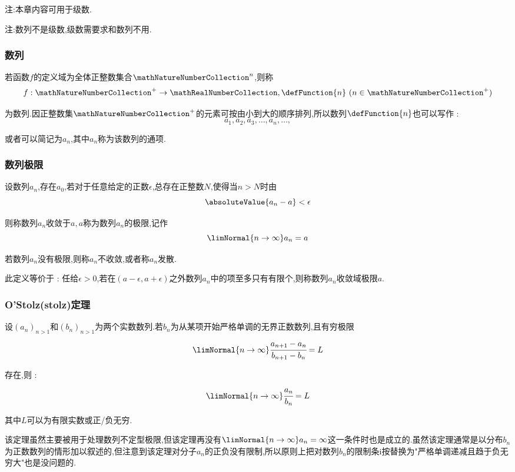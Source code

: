 {{{    注:本章内容可用于级数.

    注:数列不是级数,级数需要求和数列不用.

    \subsubsection{数列}{
      若函数$f$的定义域为全体正整数集合$\mathNatureNumberCollection^n$,则称
      $$
        f : \mathNatureNumberCollection^+ \to \mathRealNumberCollection,\defFunction{n} \ (n \in \mathNatureNumberCollection^+)
      $$

      为数列.因正整数集$\mathNatureNumberCollection^+$的元素可按由小到大的顺序排列,所以数列$\defFunction{n}$也可以写作 :
      $$
        a_1,a_2,a_3,\dots,a_n,\dots,
      $$

      或者可以简记为${a_n}$,其中$a_n$称为该数列的通项.
    }%

    \subsubsection{数列极限}{
      设数列${a_n}$,存在$a_0$,若对于任意给定的正数$\epsilon$,总存在正整数$N$,使得当$n > N$时由
      $$
        \absoluteValue{a_n - a} < \epsilon
      $$

      则称数列${a_n}$收敛于$a,a$称为数列$a_n$的极限,记作
      $$
        \limNormal{n \to \infty}a_n = a
      $$

      若数列${a_n}$没有极限,则称${a_n}$不收敛,或者称${a_n}$发散.

      此定义等价于 : 任给$\epsilon > 0$,若在$(a - \epsilon,a + \epsilon)$之外数列${a_n}$中的项至多只有有限个,则称数列${a_n}$收敛域极限$a$.
    }%

    \subsubsection{O'Stolz(stolz)定理}{
      设$(a_n)_{n > 1}$和$(b_n)_{n > 1}$为两个实数数列.若$b_n$为从某项开始严格单调的无界正数数列,且有穷极限
      $$
        \limNormal{n \to \infty}\cfrac{a_{n + 1} - a_n}{b_{n + 1} - b_n} = L
      $$

      存在,则 :
      $$
        \limNormal{n \to \infty}\cfrac{a_n}{b_n} = L
      $$

      其中$L$可以为有限实数或正/负无穷.

      该定理虽然主要被用于处理数列不定型极限,但该定理再没有$\limNormal{n \to \infty}a_n = \infty$这一条件时也是成立的.虽然该定理通常是以分布$b_n$为正数数列的情形加以叙述的,但注意到该定理对分子$a_n$的正负没有限制,所以原则上把对数列$b_n$的限制条i按替换为"严格单调递减且趋于负无穷大"也是没问题的.

}}}}
